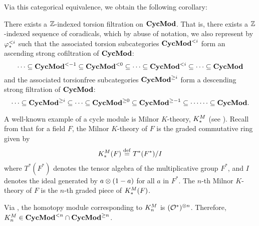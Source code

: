 Via this categorical equivalence, we obtain the following
corollary: 
\begin{cor}\label{cor_tor_filt_on_CycMod}
There exists a $\mathbb{Z}$-indexed torsion filtration on $\mathbf{CycMod}$. That
is, there exists a $\mathbb{Z}$-indexed sequence of coradicals, which by abuse
of notation, we also represent by $\varphi^{< i}_{*}$ such that the 
associated torsion subcategories $\mathbf{CycMod}^{< i}$ form an ascending 
strong cofiltration of $\mathbf{CycMod}$:
\[
\cdots \subseteq \mathbf{CycMod}^{< -1} \subseteq \mathbf{CycMod}^{< 0} \subseteq \cdots 
   \subseteq \mathbf{CycMod}^{< i} \subseteq \cdots 
   \subseteq \mathbf{CycMod}
\]
and the associated torsionfree subcategories $\mathbf{CycMod}^{\geq i}$
form a descending strong filtration of $\mathbf{CycMod}$:
\[
\cdots \subseteq \mathbf{CycMod}^{\geq i} \subseteq 
   \cdots \subseteq \mathbf{CycMod}^{\geq 0} \subseteq \mathbf{CycMod}^{\geq -1} \subseteq \cdots
   \cdots \subseteq \mathbf{CycMod}.
\]
\end{cor}

\begin{ex}\label{ex_milK}
A well-known example of a cycle module is Milnor $K$-theory,
$K^M_*$ (see \cite[1.4, 2.5]{Rost96}). Recall from \cite{MilK} that 
for a field $F$, the Milnor $K$-theory of $F$ is the graded 
commutative ring given by
\[
K^M_*(F) \stackrel{\mathrm{def}}{=} T^*(F^*)/I
\]
where $T^*(F^*)$ denotes the tensor algebra of the multiplicative 
group $F^*$, and $I$ denotes the ideal generated by $a \otimes 
(1 - a)$ for all $a$ in $F^*$. The $n$-th Milnor $K$-theory of $F$ 
is the $n$-th graded piece of $K^M_*(F)$.

Via \cite[3.7]{DegModHom}, the homotopy module corresponding to 
$K^M_n$ is $(\mathcal{O}^*)^{\otimes n}$. Therefore, $K^M_n \in
\mathbf{CycMod}^{< n} \cap \mathbf{CycMod}^{\geq n}$.
\end{ex}

%
